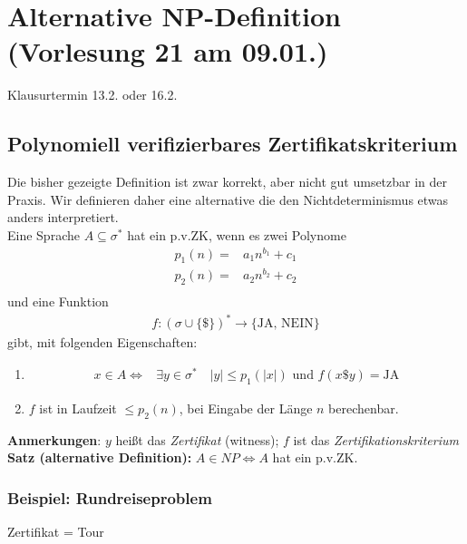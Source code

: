 \section{Alternative NP-Definition \tiny (Vorlesung 21 am 09.01.)}
Klausurtermin 13.2. oder 16.2.\\
\subsection{Polynomiell verifizierbares Zertifikatskriterium}
Die bisher gezeigte Definition ist zwar korrekt, aber nicht gut umsetzbar in der Praxis.
Wir definieren daher eine alternative die den Nichtdeterminismus etwas anders interpretiert. \\
Eine Sprache $A \subseteq \sigma^*$ hat ein p.v.ZK, wenn es zwei Polynome
\begin{align*}
p_1(n) =& a_1n^{b_1}+c_1\\
p_2(n) =& a_2n^{b_2}+c_2\\
\end{align*}
und eine Funktion 
\begin{align*}
f:(\sigma \cup \{\$\})^* \rightarrow \{\text{JA, NEIN}\}
\end{align*}
gibt, mit folgenden Eigenschaften:
\begin{enumerate}
\item 
\begin{align*}
x \in A \Leftrightarrow & \exists y \in \sigma^*\quad |y| \leq p_1(|x|) \text{ und } f(x \$ y) = \text{JA}
\end{align*}
\item $f$ ist in Laufzeit $\leq p_2(n)$, bei Eingabe der Länge $n$  berechenbar.
\end{enumerate}
\textbf{Anmerkungen}: $y$ heißt das \emph{Zertifikat} (witness); $f$ ist das \emph{Zertifikationskriterium}\\
\textbf{Satz (alternative Definition): }$A \in NP \Leftrightarrow A$ hat ein p.v.ZK.\\
\subsubsection{Beispiel: Rundreiseproblem}
Zertifikat = Tour
